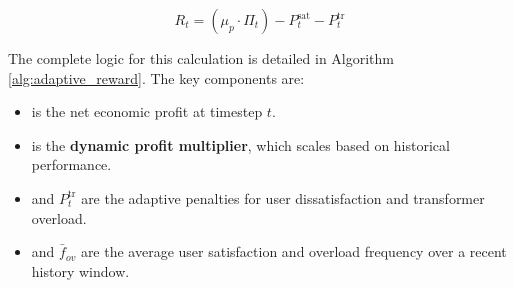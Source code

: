 \begin{equation}
    R_t = (\mu_p \cdot \Pi_t) - P_t^{\text{sat}} - P_t^{\text{tr}}
\end{equation}

\noindent
The complete logic for this calculation is detailed in Algorithm \ref{alg:adaptive_reward}. The key components are:
\begin{itemize}
    \item[$\Pi_t$] is the net economic profit at timestep $t$.
    \item[$\mu_p$] is the \textbf{dynamic profit multiplier}, which scales based on historical performance.
    \item[$P_t^{\text{sat}}$] and $P_t^{\text{tr}}$ are the adaptive penalties for user dissatisfaction and transformer overload.
    \item[$\bar{s}_{hist}$] and $\bar{f}_{ov}$ are the average user satisfaction and overload frequency over a recent history window.
\end{itemize}



